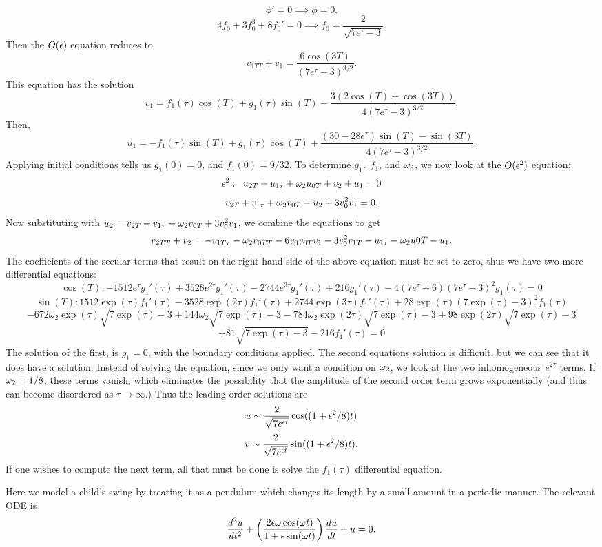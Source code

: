 $$\phi'=0\implies \phi=0.$$
$$4f_0+3f_0^3+8f_0'=0\implies f_0=\frac{2}{\sqrt{7e^\tau-3}}.$$
Then the $O(\epsilon)$ equation reduces to
$$v_{1TT}+v_1=\frac{6\cos(3T)}{(7e^\tau-3)^{3/2}}.$$
This equation has the solution
$$v_1=f_1(\tau)\cos(T)+g_1(\tau)\sin(T)-\frac{3(2\cos(T)+\cos(3T))}{4(7e^\tau-3)^{3/2}}.$$
Then,
$$u_1=-f_1(\tau)\sin(T)+g_1(\tau)\cos(T)+\frac{(30-28e^\tau)\sin(T)-\sin(3T)}{4(7e^\tau-3)^{3/2}}.$$
Applying initial conditions tells us $g_1(0)=0$, and $f_1(0)=9/32.$ To determine $g_1,$ $f_1$, and $\omega_2$, we now look at the $O(\epsilon^2)$ equation:
$$\epsilon^2:\;\; u_{2T}+u_{1\tau}+\omega_2u_{0T}+v_2+u_1=0$$
$$v_{2T}+v_{1\tau}+\omega_2v_{0T}-u_2+3v_0^2v_1=0.$$
Now substituting with $u_2=v_{2T}+v_{1\tau}+\omega_2v_{0T}+3v_0^2v_1$, we combine the equations to get
$$v_{2TT}+v_{2}=-v_{1T\tau}-\omega_2v_{0TT}-6v_0v_{0T}v_1-3v_0^2v_{1T}-u_{1\tau}-\omega_2u{0T}-u_1.$$
The coefficients of the secular terms that result on the right hand side of the above equation must be set to zero, thus we have two more differential equations:
$$\cos(T):-1512 e^{\tau }g_1'(\tau )+3528 e^{2 \tau } g_1'(\tau )-2744 e^{3 \tau } g_1'(\tau )+216g_1'(\tau )-4 \left(7 e^{\tau }+6\right) \left(7 e^{\tau }-3\right)^2 g_1(\tau )=0  $$
$$\sin(T): 1512 \exp (\tau ) f_1'(\tau )-3528 \exp (2 \tau ) f_1'(\tau )+2744 \exp (3 \tau ) f_1'(\tau )+28 \exp (\tau ) (7 \exp (\tau )-3)^2 f_1(\tau )$$
$$-672 \omega_2  \exp (\tau ) \sqrt{7 \exp (\tau )-3}+144 \omega_2  \sqrt{7 \exp (\tau )-3}-784 \omega_2  \exp (2 \tau ) \sqrt{7 \exp (\tau )-3}+98 \exp (2 \tau ) \sqrt{7 \exp (\tau )-3}$$
$$+81 \sqrt{7 \exp (\tau )-3}-216 f_1'(\tau )=0 $$
The solution of the first, is $g_1=0$, with the boundary conditions applied. The second equations solution is difficult, but we can see that it does have a solution. Instead of solving the equation, since we only want a condition on $\omega_2$, we look at the two inhomogeneous $e^{2\tau}$ terms. If $\omega_2=1/8$, these terms vanish, which eliminates the possibility that the amplitude of the second order term grows exponentially (and thus can become disordered as $\tau\to\infty$.) Thus the leading order solutions are
$$u\sim \frac{2}{\sqrt{7e^{\epsilon t}}}\cos((1+\epsilon^2/8)t)$$
$$v\sim \frac{2}{\sqrt{7e^{\epsilon t}}}\sin((1+\epsilon^2/8)t).$$
If one wishes to compute the next term, all that must be done is solve the $f_1(\tau)$ differential equation.
\item Here we model a child's swing by treating it as a pendulum which changes its length by a small amount in a periodic manner. The relevant ODE is
    $$\frac{d^2 u}{dt^2}+\left(\frac{2\epsilon \omega\cos(\omega t)}{1+\epsilon\sin(\omega t)}\right)\frac{du}{dt}+u=0.$$
